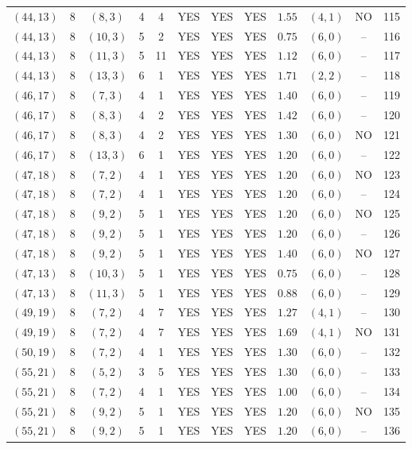 \begin{longtable}{|c|c|c|c|c|c|c|c|c|c|c|c|}
$(44,13)$ & 8 & $(8,3)$ & 4 & 4 & YES & YES & YES & $1.55$ & $(4,1)$ & NO & 115\\
$(44,13)$ & 8 & $(10,3)$ & 5 & 2 & YES & YES & YES & $0.75$ & $(6,0)$ & -- & 116\\
$(44,13)$ & 8 & $(11,3)$ & 5 & 11 & YES & YES & YES & $1.12$ & $(6,0)$ & -- & 117\\
$(44,13)$ & 8 & $(13,3)$ & 6 & 1 & YES & YES & YES & $1.71$ & $(2,2)$ & -- & 118\\
$(46,17)$ & 8 & $(7,3)$ & 4 & 1 & YES & YES & YES & $1.40$ & $(6,0)$ & -- & 119\\
$(46,17)$ & 8 & $(8,3)$ & 4 & 2 & YES & YES & YES & $1.42$ & $(6,0)$ & -- & 120\\
$(46,17)$ & 8 & $(8,3)$ & 4 & 2 & YES & YES & YES & $1.30$ & $(6,0)$ & NO & 121\\
$(46,17)$ & 8 & $(13,3)$ & 6 & 1 & YES & YES & YES & $1.20$ & $(6,0)$ & -- & 122\\
$(47,18)$ & 8 & $(7,2)$ & 4 & 1 & YES & YES & YES & $1.20$ & $(6,0)$ & NO & 123\\
$(47,18)$ & 8 & $(7,2)$ & 4 & 1 & YES & YES & YES & $1.20$ & $(6,0)$ & -- & 124\\
$(47,18)$ & 8 & $(9,2)$ & 5 & 1 & YES & YES & YES & $1.20$ & $(6,0)$ & NO & 125\\
$(47,18)$ & 8 & $(9,2)$ & 5 & 1 & YES & YES & YES & $1.20$ & $(6,0)$ & -- & 126\\
$(47,18)$ & 8 & $(9,2)$ & 5 & 1 & YES & YES & YES & $1.40$ & $(6,0)$ & NO & 127\\
$(47,13)$ & 8 & $(10,3)$ & 5 & 1 & YES & YES & YES & $0.75$ & $(6,0)$ & -- & 128\\
$(47,13)$ & 8 & $(11,3)$ & 5 & 1 & YES & YES & YES & $0.88$ & $(6,0)$ & -- & 129\\
$(49,19)$ & 8 & $(7,2)$ & 4 & 7 & YES & YES & YES & $1.27$ & $(4,1)$ & -- & 130\\
$(49,19)$ & 8 & $(7,2)$ & 4 & 7 & YES & YES & YES & $1.69$ & $(4,1)$ & NO & 131\\
$(50,19)$ & 8 & $(7,2)$ & 4 & 1 & YES & YES & YES & $1.30$ & $(6,0)$ & -- & 132\\
$(55,21)$ & 8 & $(5,2)$ & 3 & 5 & YES & YES & YES & $1.30$ & $(6,0)$ & -- & 133\\
$(55,21)$ & 8 & $(7,2)$ & 4 & 1 & YES & YES & YES & $1.00$ & $(6,0)$ & -- & 134\\
$(55,21)$ & 8 & $(9,2)$ & 5 & 1 & YES & YES & YES & $1.20$ & $(6,0)$ & NO & 135\\
$(55,21)$ & 8 & $(9,2)$ & 5 & 1 & YES & YES & YES & $1.20$ & $(6,0)$ & -- & 136\\

\end{longtable}
